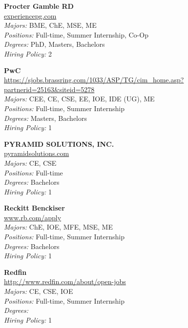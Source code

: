 \documentclass[twoside]{article}
\begin{document}
\begin{center}
\begin{multicols}{3}
\begin{minipage}{.9\columnwidth}{\Large\bf Procter Gamble RD }\\
	\url{experiencepg.com}\\
	\emph{Majors:} BME, ChE, MSE, ME\\
	\emph{Positions:} Full-time, Summer Internship, Co-Op\\
	\emph{Degrees:} PhD, Masters, Bachelors\\
	\emph{Hiring Policy:} 2\\
\end{minipage}
 
\begin{minipage}{.9\columnwidth}{\Large\bf PwC }\\
	\url{https://sjobs.brassring.com/1033/ASP/TG/cim_home.asp?partnerid=25163&siteid=5278}\\
	\emph{Majors:} CEE, CE, CSE, EE, IOE, IDE (UG), ME\\
	\emph{Positions:} Full-time, Summer Internship\\
	\emph{Degrees:} Masters, Bachelors\\
	\emph{Hiring Policy:} 1\\
\end{minipage}
 
\begin{minipage}{.9\columnwidth}{\Large\bf PYRAMID SOLUTIONS, INC. }\\
	\url{pyramidsolutions.com}\\
	\emph{Majors:} CE, CSE\\
	\emph{Positions:} Full-time\\
	\emph{Degrees:} Bachelors\\
	\emph{Hiring Policy:} 1\\
\end{minipage}
 
\begin{minipage}{.9\columnwidth}{\Large\bf Reckitt Benckiser }\\
	\url{www.rb.com/apply}\\
	\emph{Majors:} ChE, IOE, MFE, MSE, ME\\
	\emph{Positions:} Full-time, Summer Internship\\
	\emph{Degrees:} Bachelors\\
	\emph{Hiring Policy:} 1\\
\end{minipage}
 
\begin{minipage}{.9\columnwidth}{\Large\bf Redfin }\\
	\url{http://www.redfin.com/about/open-jobs}\\
	\emph{Majors:} CE, CSE, IOE\\
	\emph{Positions:} Full-time, Summer Internship\\
	\emph{Degrees:} \\
	\emph{Hiring Policy:} 1\\
\end{minipage}
 

\end{multicols}
\end{center}
\end{document}
